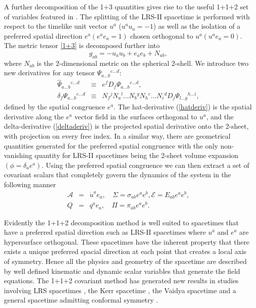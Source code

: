 \documentclass[abstract=on,notitlepage,superscriptaddress,nofootinbib,aps,showpacs,twocolumn,prd]{revtex4}
\newcommand{\0}{^{(0)}}
\newcommand{\1}{^{(1)}}
\newcommand{\2}{^{(2)}}
\newcommand{\3}{{}^{(3)}}
\begin{document}
A further decomposition of the 1+3 quantities gives rise to the useful 1+1+2 set of variables featured in  \cite{clarksonbarrett}. The splitting of the LRS-II spacetime is performed with respect to the timelike unit vector $u^a$ ($u^au_a = -1$) as well as the isolation of a preferred spatial direction $e^a (e^ae_a = 1)$ chosen orthogonal to $u^a (u^a e_a = 0)$. The metric tensor \eqref{1+3} is decomposed further into
\begin{equation}
g_{ab}=-u_a u_b+e_a e_b+N_{ab},
\end{equation}
where $N_{ab}$ is the 2-dimensional metric on the spherical 2-shell. We introduce two new derivatives for any tensor ${\Psi_{a...b}{}^{c...d}}$:
\begin{eqnarray}
\label{hatderiv}
\hat{\Psi}_{a...b}{}^{c...d} &\equiv& e^{f} D_{f} \Psi_{a...b}{}^{c...d}, \\
\label{deltaderiv}
\delta_{f}\Psi_{a...b}{}^{c...d} &\equiv& N_{f}{}^{j} N_{a}{}^{l} ... N_{b}{}^{g} N_{h}{}^{c} ... N_{i}{}^{d}  D_{j}\Psi_{l...g}{}^{h...i}, 
\end{eqnarray}
defined by the spatial congruence ${e^{a}}$. The hat-derivative (\ref{hatderiv}) is the spatial derivative along the ${e^{a}}$ vector field in the surfaces orthogonal to ${u^{a}}$, and the delta-derivative (\ref{deltaderiv}) is the projected spatial derivative onto the 2-sheet, with projection on every free index. In a similar way, there are geometrical quantities generated for the preferred spatial congruence with the only non-vanishing quantity for LRS-II spacetimes being the 2-sheet volume expansion $(\phi = \delta_a e^a)$. Using the preferred spatial congruence we can then extract a set of covariant scalars that completely govern the dynamics of the system in the following manner
\begin{eqnarray}
\mathcal{A} &=& \dot{u}^a e_a, \quad \Sigma = \sigma_{ab}e^a e^b, \mathcal{E} = E_{ab}e^a e^b, \nonumber\\
 Q &=& q^a e_a, \quad \Pi = \pi_{ab}e^a e^b.
\end{eqnarray}

Evidently the 1+1+2 decomposition method is well suited to spacetimes that have a preferred spatial direction such as LRS-II spacetimes where $u^a$ and $e^a$ are hypersurface orthogonal. These spacetimes have the inherent property that there exists a unique preferred spacial direction at each point that creates a local axis of symmetry. Hence all the physics and geometry of the spacetime are described by well defined kinematic and dynamic scalar variables that generate the field equations. The 1+1+2 covariant method has generated new results in studies involving LRS spacetimes \cite{sayuri}, the Kerr spacetime \cite{kerr}, the Vaidya spacetime \cite{vaidya} and a general spacetime admitting conformal symmetry \cite{CKV}.
\end{document}
